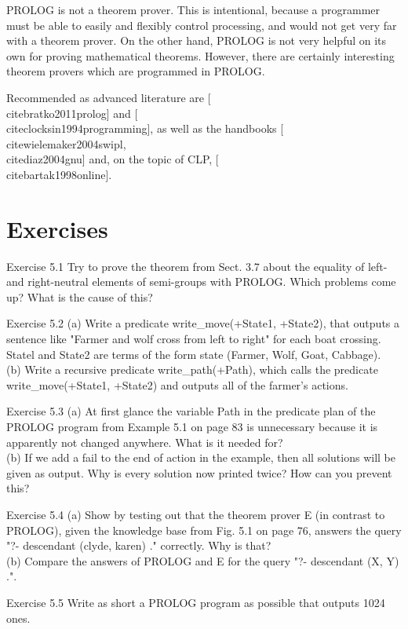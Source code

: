 \documentclass[10pt]{book}
\begin{document}
PROLOG is not a theorem prover. This is intentional, because a programmer must be able to easily and flexibly control processing, and would not get very far with a theorem prover. On the other hand, PROLOG is not very helpful on its own for proving mathematical theorems. However, there are certainly interesting theorem provers which are programmed in PROLOG.

Recommended as advanced literature are [\\cite{bratko2011prolog}] and [\\cite{clocksin1994programming}], as well as the handbooks [\\cite{wielemaker2004swipl}, \\cite{diaz2004gnu}] and, on the topic of CLP, [\\cite{bartak1998online}].

\section{Exercises}
Exercise 5.1 Try to prove the theorem from Sect. 3.7 about the equality of left- and right-neutral elements of semi-groups with PROLOG. Which problems come up? What is the cause of this?

Exercise 5.2
(a) Write a predicate write\_move(+State1, +State2), that outputs a sentence like "Farmer and wolf cross from left to right" for each boat crossing. Statel and State2 are terms of the form state (Farmer, Wolf, Goat, Cabbage).\\
(b) Write a recursive predicate write\_path(+Path), which calls the predicate write\_move(+State1, +State2) and outputs all of the farmer's actions.

Exercise 5.3
(a) At first glance the variable Path in the predicate plan of the PROLOG program from Example 5.1 on page 83 is unnecessary because it is apparently not changed anywhere. What is it needed for?\\
(b) If we add a fail to the end of action in the example, then all solutions will be given as output. Why is every solution now printed twice? How can you prevent this?

Exercise 5.4
(a) Show by testing out that the theorem prover E (in contrast to PROLOG), given the knowledge base from Fig. 5.1 on page 76, answers the query "?- descendant (clyde, karen) ." correctly. Why is that?\\
(b) Compare the answers of PROLOG and E for the query "?- descendant (X, Y) .".

Exercise 5.5 Write as short a PROLOG program as possible that outputs 1024 ones.
\end{document}
